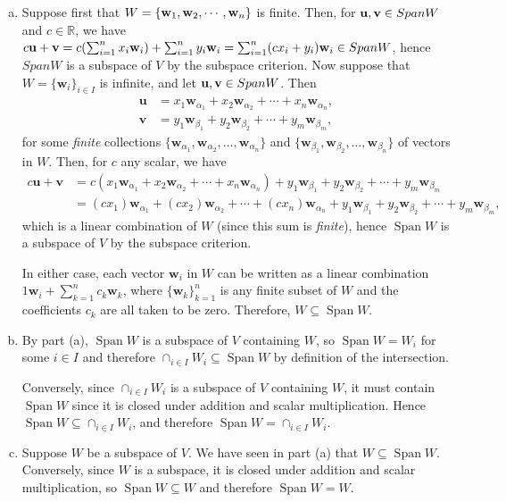 \documentclass[12pt,letterpaper,reqno]{article}
\numberwithin{equation}{section}
\DeclareMathOperator{\Span}{Span}
\begin{document}
\begin{pf}
\begin{enumerate}[(a)]
	\item Suppose first that $W=\{{\bf w}_1,{\bf w}_2,\cdots,{\bf w}_n\}$ is finite. Then, for ${\bf u},{\bf v} \in Span W$ and $c \in \mathbb{R}$, we have $c{\bf u}+{\bf v} =c(\sum_{i=1}^nx_i{\bf w}_i)+\sum_{i=1}^ny_i{\bf w}_i=\sum_{i=1}^n(cx_i+y_i){\bf w}_i \in Span W$, hence $Span W$ is a subspace of $V$ by the subspace criterion. Now suppose that $W=\{\mathbf{w}_i\}_{i \in I}$ is infinite, and let ${\bf u},{\bf v} \in Span W$. Then 
\begin{align*}
	\mathbf{u}&=x_1\mathbf{w}_{\alpha_1}+x_2\mathbf{w}_{\alpha_2}+\cdots+x_n\mathbf{w}_{\alpha_n}, \\
	\mathbf{v}&=y_1\mathbf{w}_{\beta_1}+y_2\mathbf{w}_{\beta_2}+\cdots+y_m\mathbf{w}_{\beta_m}, 
\end{align*}
for some \emph{finite} collections $\{\mathbf{w}_{\alpha_1}, \mathbf{w}_{\alpha_2}, \dots,\mathbf{w}_{\alpha_n}\}$ and $\{\mathbf{w}_{\beta_1}, \mathbf{w}_{\beta_2}, \dots,\mathbf{w}_{\beta_n}\}$ of vectors in $W$. Then, for $c$ any scalar, we have
\begin{align*}
	c\mathbf{u}+\mathbf{v}&=c(x_1\mathbf{w}_{\alpha_1}+x_2\mathbf{w}_{\alpha_2}+\cdots+x_n\mathbf{w}_{\alpha_n})+y_1\mathbf{w}_{\beta_1}+y_2\mathbf{w}_{\beta_2}+\cdots+y_m\mathbf{w}_{\beta_m} \\
	&=(cx_1)\mathbf{w}_{\alpha_1}+(cx_2)\mathbf{w}_{\alpha_2}+\cdots+(cx_n)\mathbf{w}_{\alpha_n}+y_1\mathbf{w}_{\beta_1}+y_2\mathbf{w}_{\beta_2}+\cdots+y_m\mathbf{w}_{\beta_m},
\end{align*}
which is a linear combination of $W$ (since this sum is \emph{finite}), hence $\Span W$ is a subspace of $V$ by the subspace criterion. 

In either case, each vector $\mathbf{w}_i$ in $W$ can be written as a linear combination $1\mathbf{w}_i+\sum_{k=1}^n c_k\mathbf{w}_k$, where $\{\mathbf{w}_k\}_{k=1}^n$ is any finite subset of $W$ and the coefficients $c_k$ are all taken to be zero. Therefore, $W \subseteq \Span W$.
\item By part (a), $\Span W$ is a subspace of $V$ containing $W$, so $\Span W=W_i$ for some $i\in I$ and therefore $\cap_{i \in I}W_i \subseteq \Span W$ by definition of the intersection.

Conversely, since $\cap_{i \in I}W_i$ is a subspace of $V$ containing $W$, it must contain $\Span W$ since it is closed under addition and scalar multiplication. Hence $\Span W \subseteq \cap_{i \in I}W_i$, and therefore $\Span W = \cap_{i \in I}W_i$.
\item Suppose $W$ be a subspace of $V$. We have seen in part (a) that $W \subseteq \Span W$.  Conversely, since $W$ is a subspace, it is closed under addition and scalar multiplication, so $\Span W \subseteq W$ and therefore $\Span W=W$.
\end{enumerate}
\end{pf}
\end{document}
